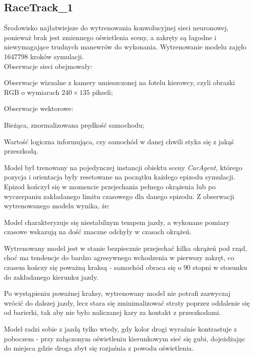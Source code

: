 \subsection{RaceTrack\_1}
Środowisko najłatwiejsze do wytrenowania konwolucyjnej sieci neuronowej, ponieważ brak jest zmiennego oświetlenia sceny, a zakręty są łagodne i niewymagające trudnych manewrów do wykonania. Wytrenowanie modelu zajęło 1647798 kroków symulacji. \\
Obserwacje sieci obejmowały:
\vspace*{-0.5cm}
\begin{enumerate*}
\item Obserwacje wizualne z kamery umieszczonej na fotelu kierowcy, czyli obrazki RGB o wymiarach $240 \times 135$ pikseli;
\item Obserwacje wektorowe:
\begin{itemize*}
\item Bieżąca, znormalizowana prędkość samochodu;
\item Wartość logiczna informująca, czy samochód w danej chwili styka się z jakąś przeszkodą.
\end{itemize*}
\end{enumerate*}

Model był trenowany na pojedynczej instancji obiektu sceny \textit{CarAgent}, którego pozycja i orientacja były resetowane na początku każdego epizodu symulacji. Epizod kończył się w momencie przejechania pełnego okrążenia lub po wyczerpaniu zakładanego limitu czasowego dla danego epizodu. Z obserwacji wytrenowanego modelu wynika, że:
\vspace*{-0.5cm}
\begin{enumerate*}
\item Model charakteryzuje się niestabilnym tempem jazdy, a wykonane pomiary czasowe wskazują na dość znaczne odchyły w czasach okrążeń.
\item Wytrenowany model jest w stanie bezpiecznie przejechać kilka okrążeń pod rząd, choć ma tendencje do bardzo agresywnego wchodzenia w pierwszy zakręt, co czasem kończy się poważną kraksą - samochód obraca się o 90 stopni w stosunku do zakładanego kierunku jazdy.
\item Po wystąpieniu poważnej kraksy, wytrenowany model nie potrafi zazwyczaj wrócić do dalszej jazdy, lecz stara się zminimalizować straty poprzez oddalenie się od barierki, tak aby nie było naliczanej kary za kontakt z przeszkodami.
\item Model radzi sobie z jazdą tylko wtedy, gdy kolor drogi wyraźnie kontrastuje z poboczem - przy załączonym oświetleniu kierunkowym sieć się gubi, dojeżdżając do miejsca gdzie droga zbyt się rozjaśnia z powodu oświetlenia.
\end{enumerate*}

